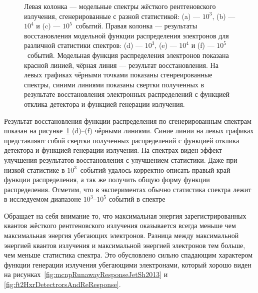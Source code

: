 \begin{figure}[ht!]
  \caption{ Левая колонка --- модельные спектры жёсткого рентгеновского излучения, сгенерированные с разной статистикой: (a) --- $10^3$, (b) --- $10^4$ и (c) --- $10^5$~событий. Правая колонка --- результаты восстановления модельной функции распределения электронов для различной статистики спектров: (d) --- $10^3$, (e) --- $10^4$ и (f) --- $10^5$~событий. Модельная функция распределения электронов показана красной линией, чёрная линия --- результат восстановления. На левых графиках чёрными точками показаны сгенреированные спектры, синими линиями показаны свертки полученных в результате восстановления электронных распределений с функцией отклика детектора и функцией генерации излучения.~\cite{Shevelev2016} }
  \label{fig:ft2TestReStatistics}
\end{figure}

Результат восстановления функции распределения по сгенерированным спектрам показан на рисунке~\ref{fig:ft2TestReStatistics} (d)--(f) чёрными линиями. Синие линии на левых графиках представляют собой свертки полученных распределений с функцией отклика детектора и функцией генерации излучения. На спектрах виден эффект улучшения результатов восстановления с улучшением статистики. Даже при низкой статистике в $10^3$~событий удалось корректно описать правый край функции распределения, а так же получить общую форму функции распределения. Отметим, что в экспериментах обычно статистика спектра лежит в исследуемом диапазоне $10^3$--$10^5$ событий в спектре~\cite{Shevelev2016}

Обращает на себя внимание то, что максимальная энергия зарегистрированных квантов жёсткого рентгеновского излучения оказывается всегда меньше чем максимальная энергия убегающих электронов. Разница между максимальной энергией квантов излучения и максимальной энергией электронов тем больше, чем меньше статистика спектра. Это обусловлено сильно спадающим характером функции генерации излучения убегающими электронами, который хорошо виден на рисунках~\ref{fig:mcnpRunawayResponseJetSh2013} и \ref{fig:ft2HxrDetectrorsAndReResponse}.~\cite{Shevelev2016}


